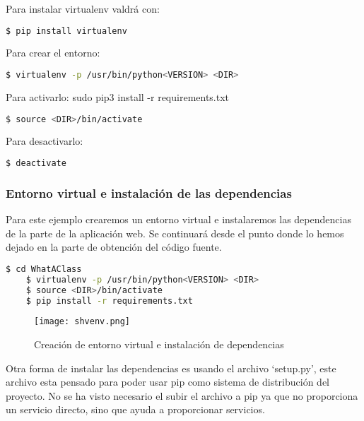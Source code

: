 Para instalar virtualenv valdrá con: 

\begin{lstlisting}[language=bash]
    $ pip install virtualenv
\end{lstlisting}


Para crear el entorno:

\begin{lstlisting}[language=bash]
    $ virtualenv -p /usr/bin/python<VERSION> <DIR>
\end{lstlisting}


	
Para activarlo: sudo pip3 install -r requirements.txt

\begin{lstlisting}[language=bash]
    $ source <DIR>/bin/activate
\end{lstlisting}


Para desactivarlo:

\begin{lstlisting}[language=bash]
    $ deactivate
\end{lstlisting}


\subsubsection{Entorno virtual e instalación de las dependencias}

Para este ejemplo crearemos un entorno virtual e instalaremos las dependencias de la parte de la aplicación web. Se continuará desde el punto donde lo hemos dejado en la parte de obtención del código fuente.

\begin{lstlisting}[language=bash]
    $ cd WhatAClass
    $ virtualenv -p /usr/bin/python<VERSION> <DIR>
    $ source <DIR>/bin/activate
    $ pip install -r requirements.txt
\end{lstlisting}

\begin{figure}
	\centering
	\texttt{[image: shvenv.png]}
	\caption{Creación de entorno virtual e instalación de dependencias}\label{fig:shvenv.png}
\end{figure}

Otra forma de instalar las dependencias es usando el archivo `setup.py', este archivo esta pensado para poder usar pip como sistema de distribución del proyecto. No se ha visto necesario el subir el archivo a pip ya que no proporciona un servicio directo, sino que ayuda a proporcionar servicios. 

